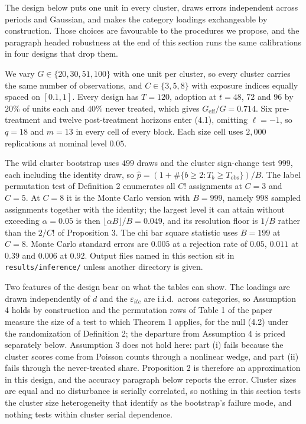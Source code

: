 \documentclass[12pt]{article}
\theoremstyle{definition}
\numberwithin{equation}{section}
\begin{document}
The design below puts one unit in every cluster, draws errors independent
across periods and Gaussian, and makes the category loadings exchangeable by
construction. Those choices are favourable to the procedures we propose, and
the paragraph headed robustness at the end of this section runs the same
calibrations in four designs that drop them.

We vary $G \in \{20,30,51,100\}$ with one unit per cluster, so every cluster
carries the same number of observations, and $C \in \{3,5,8\}$ with exposure
indices equally spaced on $[0.1,1]$. Every design has $T = 120$, adoption at
$t = 48$, $72$ and $96$ by $20\%$ of units each and $40\%$ never treated,
which gives $G_{\mathrm{eff}}/G = 0.714$. Six pre-treatment and twelve
post-treatment horizons enter (4.1), omitting $\ell = -1$, so
$q = 18$ and $m = 13$ in every cell of every block. Each size cell uses
$2{,}000$ replications at nominal level $0.05$.

The wild cluster bootstrap uses $499$ draws and the cluster sign-change test
$999$, each including the identity draw, so $\hat{p} = (1 + \#\{b \ge 2 :
T_b \ge T_{\mathrm{obs}}\})/B$. The label permutation test of Definition
2 enumerates all $C!$ assignments at $C = 3$ and $C = 5$. At
$C = 8$ it is the Monte Carlo version with $B = 999$, namely $998$ sampled
assignments together with the identity; the largest level it can attain
without exceeding $\alpha = 0.05$ is then $\lfloor \alpha B \rfloor / B =
0.049$, and its resolution floor is $1/B$ rather than the $2/C!$ of
Proposition 3.
The chi bar square statistic uses $B = 199$ at $C = 8$. Monte Carlo standard
errors are $0.005$ at a rejection rate of $0.05$, $0.011$ at $0.39$ and
$0.006$ at $0.92$. Output files named in this section sit in
\texttt{results/inference/} unless another directory is given.

Two features of the design bear on what the tables can show. The loadings are
drawn independently of $d$ and the $\varepsilon_{itc}$ are i.i.d.\ across
categories, so Assumption 4 holds by construction and the
permutation rows of Table 1 of the paper measure the size of a test to which
Theorem 1 applies, for the null (4.2) under the
randomization of Definition 2; the departure from Assumption
4 is priced separately below. Assumption 3 does not hold
here: part (i) fails because the cluster scores come from Poisson counts
through a nonlinear wedge, and part (ii) fails through the never-treated share. Proposition 2 is therefore an approximation in this
design, and the accuracy paragraph below reports the error. Cluster sizes are
equal and no disturbance is serially correlated, so nothing in this section
tests the cluster size heterogeneity that \citet{mackinnon2017wild} identify
as the bootstrap's failure mode, and nothing tests within cluster serial
dependence.
\end{document}
